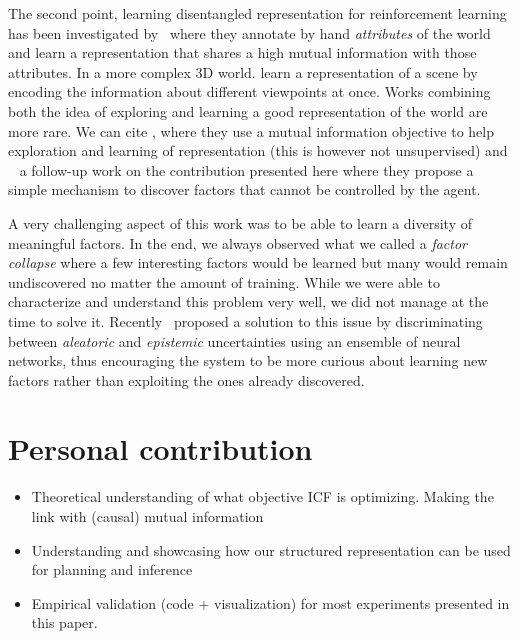 The second point, learning disentangled representation for reinforcement learning has been investigated by~\citet{anand2019unsupervised} where they annotate by hand \emph{attributes} of the world and learn a representation that shares a high mutual information with those attributes. In a more complex 3D world. \citet{eslami2018neural} learn a representation of a scene by encoding the information about different viewpoints at once. Works combining both the idea of exploring and learning a good representation of the world are more rare. We can cite \citet{kim2019emi}, where they use a mutual information objective to help exploration and learning of representation (this is however not unsupervised) and ~\citet{li2018disentangled} a follow-up work on the contribution presented here where they propose a simple mechanism to discover factors that cannot be controlled by the agent.

A very challenging aspect of this work was to be able to learn a diversity of meaningful factors. In the end, we always observed what we called a \emph{factor collapse} where a few interesting factors would be learned but many would remain undiscovered no matter the amount of training. While we were able to characterize and understand this problem very well, we did not manage at the time to solve it. Recently~\citet{strouse2021learning} proposed a solution to this issue by discriminating between \emph{aleatoric} and \emph{epistemic} uncertainties using an ensemble of neural networks, thus encouraging the system to be more curious about learning new factors rather than exploiting the ones already discovered.

\section*{Personal contribution}
\begin{itemize}
    \item Theoretical understanding of what objective ICF is optimizing. Making the link with (causal) mutual information
    \item Understanding and showcasing how our structured representation can be used for planning and inference
    \item Empirical validation (code + visualization) for most experiments presented in this paper.
\end{itemize}

\newpage

